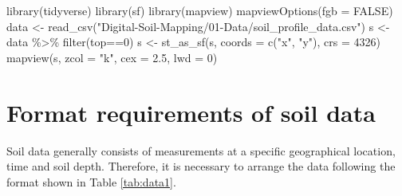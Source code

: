 \documentclass[
  10pt,
  b5paper,
  oneside]{book}
\newenvironment{Shaded}{\begin{snugshade}}{\end{snugshade}}
\newcommand{\AttributeTok}[1]{\textcolor[rgb]{0.77,0.63,0.00}{#1}}
\newcommand{\ConstantTok}[1]{\textcolor[rgb]{0.00,0.00,0.00}{#1}}
\newcommand{\DecValTok}[1]{\textcolor[rgb]{0.00,0.00,0.81}{#1}}
\newcommand{\FloatTok}[1]{\textcolor[rgb]{0.00,0.00,0.81}{#1}}
\newcommand{\FunctionTok}[1]{\textcolor[rgb]{0.00,0.00,0.00}{#1}}
\newcommand{\NormalTok}[1]{#1}
\newcommand{\OtherTok}[1]{\textcolor[rgb]{0.56,0.35,0.01}{#1}}
\newcommand{\SpecialCharTok}[1]{\textcolor[rgb]{0.00,0.00,0.00}{#1}}
\newcommand{\StringTok}[1]{\textcolor[rgb]{0.31,0.60,0.02}{#1}}
\begin{document}
\begin{Shaded}
\begin{Highlighting}[]
\FunctionTok{library}\NormalTok{(tidyverse)}
\FunctionTok{library}\NormalTok{(sf)}
\FunctionTok{library}\NormalTok{(mapview)}
\FunctionTok{mapviewOptions}\NormalTok{(}\AttributeTok{fgb =} \ConstantTok{FALSE}\NormalTok{)}
\NormalTok{data }\OtherTok{\textless{}{-}} \FunctionTok{read\_csv}\NormalTok{(}\StringTok{"Digital{-}Soil{-}Mapping/01{-}Data/soil\_profile\_data.csv"}\NormalTok{)}
\NormalTok{s }\OtherTok{\textless{}{-}}\NormalTok{ data }\SpecialCharTok{\%\textgreater{}\%} \FunctionTok{filter}\NormalTok{(top}\SpecialCharTok{==}\DecValTok{0}\NormalTok{)}
\NormalTok{s }\OtherTok{\textless{}{-}} \FunctionTok{st\_as\_sf}\NormalTok{(s, }\AttributeTok{coords =} \FunctionTok{c}\NormalTok{(}\StringTok{"x"}\NormalTok{, }\StringTok{"y"}\NormalTok{), }\AttributeTok{crs =} \DecValTok{4326}\NormalTok{)}
\FunctionTok{mapview}\NormalTok{(s, }\AttributeTok{zcol =} \StringTok{"k"}\NormalTok{, }\AttributeTok{cex =} \FloatTok{2.5}\NormalTok{, }\AttributeTok{lwd =} \DecValTok{0}\NormalTok{)}
\end{Highlighting}
\end{Shaded}

\hypertarget{preproc}{%
\section{Format requirements of soil data}\label{preproc}}

Soil data generally consists of measurements at a specific geographical location, time and soil depth. Therefore, it is necessary to arrange the data following the format shown in Table \ref{tab:data1}.
\end{document}
